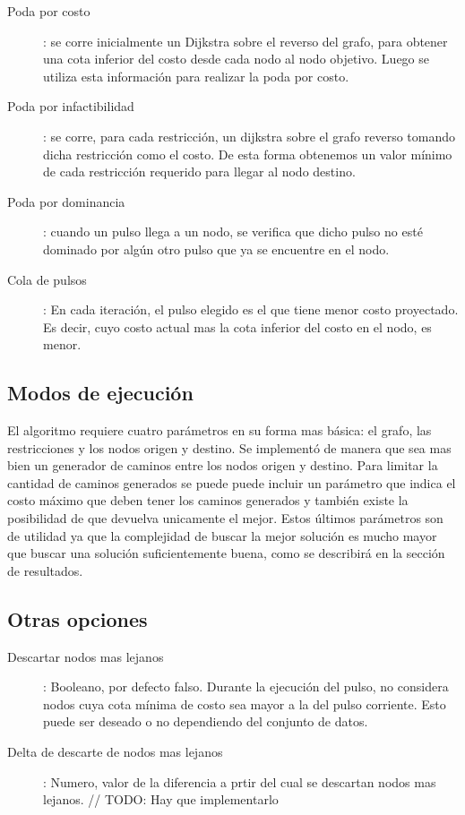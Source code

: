 \documentclass{article}
\begin{document}
  \begin{description}
    \item[Poda por costo]: {se corre inicialmente un Dijkstra sobre el reverso del grafo, para obtener una cota inferior del costo desde cada nodo al nodo objetivo. Luego se utiliza esta información para realizar la poda por costo.}
    \item[Poda por infactibilidad]: {se corre, para cada restricción, un dijkstra sobre el grafo reverso tomando dicha restricción como el costo. De esta forma obtenemos un valor mínimo de cada restricción requerido para llegar al nodo destino.}
    \item[Poda por dominancia]: {cuando un pulso llega a un nodo, se verifica que dicho pulso no esté dominado por algún otro pulso que ya se encuentre en el nodo.}
    \item[Cola de pulsos]: {En cada iteración, el pulso elegido es el que tiene menor costo proyectado. Es decir, cuyo costo actual mas la cota inferior del costo en el nodo, es menor.}
  \end{description}

  \subsection*{Modos de ejecución}

  El algoritmo requiere cuatro parámetros en su forma mas básica: el grafo, las restricciones y los nodos origen y destino. Se implementó de manera que sea mas bien un generador de caminos entre los nodos origen y destino. Para limitar la cantidad de caminos generados se puede puede incluir un parámetro que indica el costo máximo que deben tener los caminos generados y también existe la posibilidad de que devuelva unicamente el mejor. Estos últimos parámetros son de utilidad ya que la complejidad de buscar la mejor solución es mucho mayor que buscar una solución suficientemente buena, como se describirá en la sección de resultados.

  \subsection*{Otras opciones}

  \begin{description}
    \item[Descartar nodos mas lejanos]: Booleano, por defecto falso. Durante la ejecución del pulso, no considera nodos cuya cota mínima de costo sea mayor a la del pulso corriente. Esto puede ser deseado o no dependiendo del conjunto de datos.
    \item[Delta de descarte de nodos mas lejanos]: Numero, valor de la diferencia a prtir del cual se descartan nodos mas lejanos. // TODO: Hay que implementarlo 
  \end{description}
\end{document}
